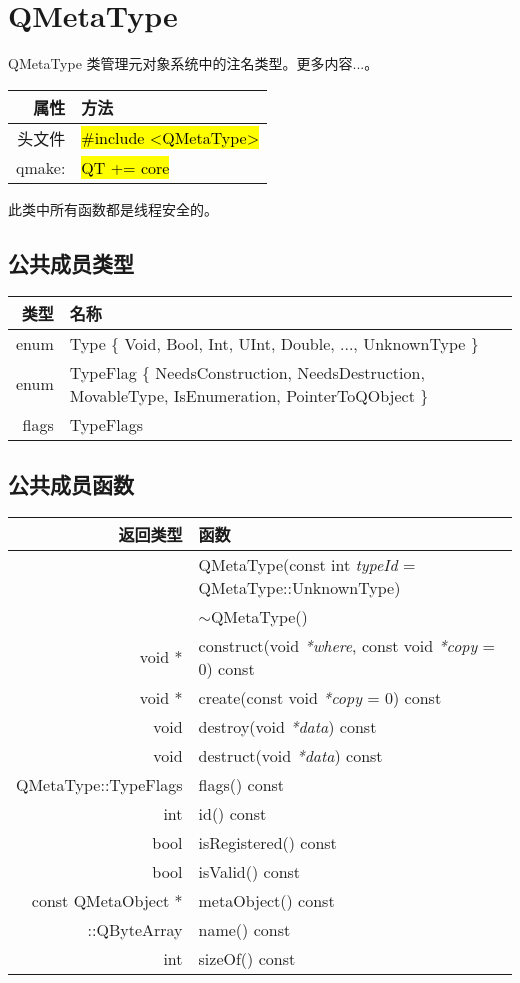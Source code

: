 \chapter{QMetaType}

QMetaType 类管理元对象系统中的注名类型。更多内容...。

\begin{tabular}{|r|l|}
	\hline
	属性 & 方法 \\
	\hline
    头文件  &	\hl{\#include <QMetaType>} \\
    \hline
    qmake: & \hl{QT += core}    \\
	\hline
\end{tabular}

\begin{notice}
此类中所有函数都是线程安全的。
\end{notice}

\section{公共成员类型}

\begin{tabular}{|r|m{25em}|}   
\hline
类型 	& 名称 \\
\hline
enum &	Type \{ Void, Bool, Int, UInt, Double, ..., UnknownType \} \\
\hline
enum &	TypeFlag \{ NeedsConstruction, NeedsDestruction, MovableType, IsEnumeration, PointerToQObject \}\\
\hline
flags &	TypeFlags\\
\hline
\end{tabular}

\section{公共成员函数}

\begin{longtable}{|r|m{28em}|}   
\hline
返回类型 	& 函数 \\
\hline
& QMetaType(const int \emph{typeId} = QMetaType::UnknownType) \\ 
\hline
& $\sim$QMetaType() \\
\hline
void *	&construct(void \emph{*where}, const void \emph{*copy} = 0) const \\
\hline
void *	&create(const void \emph{*copy} = 0) const \\
\hline
void	&destroy(void \emph{*data}) const \\
\hline
void	&destruct(void \emph{*data}) const \\
\hline
QMetaType::TypeFlags &	flags() const \\
\hline
int	& id() const \\ 
\hline
bool	&isRegistered() const \\
\hline
bool	&isValid() const \\
\hline
const QMetaObject *	& metaObject() const \\
\hline
::QByteArray &	name() const \\
\hline
int	& sizeOf() const \\
\hline
\end{longtable}

